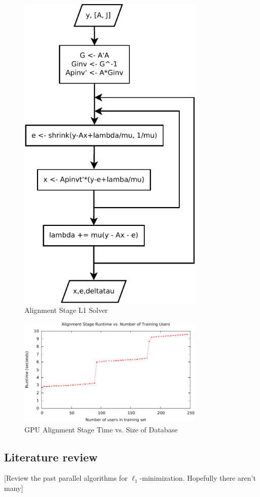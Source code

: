 \documentclass[10pt,twocolumn,letterpaper]{article}
\begin{document}
\begin{figure}
\centering
\includegraphics[width=3.5in]{figures/alignment_l1.pdf}
\caption{Alignment Stage L1 Solver}
\label{fig:alignment_l1}
\end{figure}

\begin{figure}
\centering
\includegraphics[width=3.5in]{figures/runtime_graph.pdf}
\caption{GPU Alignment Stage Time vs. Size of Database}
\label{fig:alignment_runtime}
\end{figure}

\subsection{Literature review}
[Review the past parallel algorithms for $\ell_1$-minimization. Hopefully there aren't many]
\end{document}
